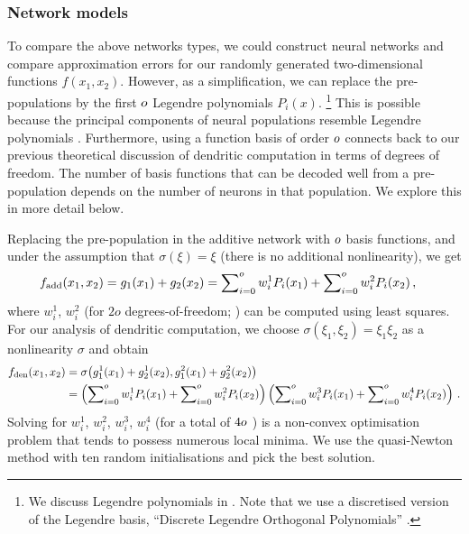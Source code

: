 \subsubsection{Network models}
To compare the above networks types, we could construct neural networks and compare approximation errors for our randomly generated two-dimensional functions $f(x_1, x_2)$.
However, as a simplification, we can replace the pre-populations by the first $o$ Legendre polynomials $P_i(x)$.%
\footnote{We discuss Legendre polynomials in . Note that we use a discretised version of the Legendre basis, \enquote{Discrete Legendre Orthogonal Polynomials} \citep[DLOPs;][]{neuman1974discrete,stockel2021discrete}.}
This is possible because the principal components of neural populations resemble Legendre polynomials \citep[Chapter~7]{eliasmith2003neural}.
Furthermore, using a function basis of order $o$ connects back to our previous theoretical discussion of dendritic computation in terms of degrees of freedom.
The number of basis functions that can be decoded well from a pre-population depends on the number of neurons in that population.
We explore this in more detail below.

Replacing the pre-population in the additive network with $o$ basis functions, and under the assumption that $\sigma(\xi) = \xi$ (there is no additional nonlinearity), we get
\begin{align}
	f_\mathrm{add}(x_1, x_2) &= g_1(x_1) + g_2(x_2) = \sum\nolimits_{i = 0}^{o} w^1_{i} P_i(x_1) + \sum\nolimits_{i = 0}^{o} w^2_{i} P_i(x_2) \,,
	\label{eqn:f_add}
\end{align}
where $w_i^1$, $w_i^2$ (for $2o$ degrees-of-freedom; \DOF) can be computed using least squares.
For our analysis of dendritic computation, we choose $\sigma(\xi_1, \xi_2) = \xi_1 \xi_2$ as a nonlinearity $\sigma$ and obtain
\begin{align}
	\begin{aligned}
		f_\mathrm{den}(x_1, x_2)
			&= \sigma\big(g^1_1(x_1) + g^1_2(x_2), g^2_1(x_1) + g^2_2(x_2)\big) \\
			&= \left( \sum\nolimits_{i = 0}^{o} w^1_{i} P_i(x_1) + \sum\nolimits_{i = 0}^{o} w^2_{i} P_i(x_2) \right)
			   \left( \sum\nolimits_{i = 0}^{o} w^3_{i} P_i(x_1) + \sum\nolimits_{i = 0}^{o} w^4_{i} P_i(x_2) \right)  \,.
	\end{aligned}
	\label{eqn:f_den}
\end{align}
Solving for $w^1_{i}$, $w^2_{i}$, $w^3_{i}$, $w^4_{i}$ (for a total of $4o$ \DOF) is a non-convex optimisation problem that tends to possess numerous local minima.
We use the \BFGS quasi-Newton method \citep[Chapter~8]{nocedal2006numerical} with ten random initialisations and pick the best solution.

